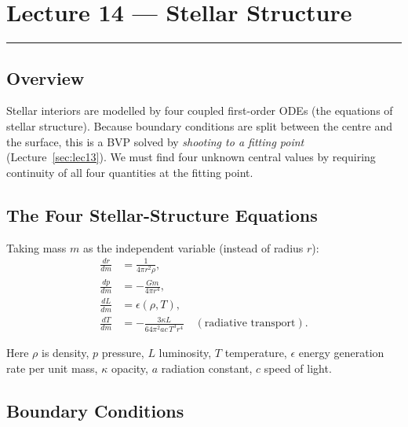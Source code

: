 
\section{Lecture 14 — Stellar Structure}\label{sec:lec14}
\hrule\vspace{1.5em}

\subsection*{Overview}
Stellar interiors are modelled by four coupled first-order ODEs
(the equations of stellar structure).  Because boundary conditions
are split between the centre and the surface, this is a BVP solved
by \emph{shooting to a fitting point} (Lecture~\ref{sec:lec13}).
We must find four unknown central values by requiring continuity of
all four quantities at the fitting point.

\subsection{The Four Stellar-Structure Equations}\label{subsec:lec14:odes}

Taking mass $m$ as the independent variable (instead of radius $r$):
\begin{align}
  \frac{dr}{dm} &= \frac{1}{4\pi r^2 \rho}, \label{eq:lec14:drm}\\
  \frac{dp}{dm} &= -\frac{G m}{4\pi r^4}, \label{eq:lec14:dpm}\\
  \frac{dL}{dm} &= \epsilon(\rho, T), \label{eq:lec14:dLm}\\
  \frac{dT}{dm} &= -\frac{3\kappa L}{64\pi^2 ac\,T^3 r^4}
                   \quad (\text{radiative transport}).
  \label{eq:lec14:dTm}
\end{align}

Here $\rho$ is density, $p$ pressure, $L$ luminosity, $T$ temperature,
$\epsilon$ energy generation rate per unit mass, $\kappa$ opacity,
$a$ radiation constant, $c$ speed of light.

\subsection{Boundary Conditions}\label{subsec:lec14:bc}

